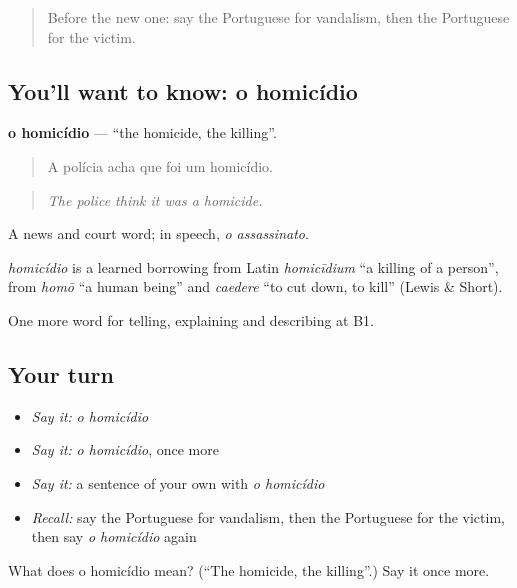 \label{lesson:PT-C286-homicidio}



\begin{quote}
Before the new one: say the Portuguese for vandalism, then the Portuguese for the victim.
\end{quote}

\subsection*{You'll want to know: o homicídio}
\textbf{o homicídio} — \textquotedblleft{}the homicide, the killing\textquotedblright{}.

\begin{quote}
A polícia acha que foi um homicídio.
\end{quote}

\begin{quote}
\emph{The police think it was a homicide.}
\end{quote}

A news and court word; in speech, \emph{o assassinato}.

\begin{cousinweb}
\emph{homicídio} is a learned borrowing from Latin \emph{homicīdium} \textquotedblleft{}a killing of a person\textquotedblright{}, from \emph{homō} \textquotedblleft{}a human being\textquotedblright{} and \emph{caedere} \textquotedblleft{}to cut down, to kill\textquotedblright{} (Lewis \& Short).
\end{cousinweb}

\begin{grammarlens}[title={What you've built}]
One more word for telling, explaining and describing at B1.
\end{grammarlens}

\subsection*{Your turn}
\begin{itemize}
\raggedright
  \item \emph{Say it:} \emph{o homicídio}
  \item \emph{Say it:} \emph{o homicídio}, once more
  \item \emph{Say it:} a sentence of your own with \emph{o homicídio}
  \item \emph{Recall:} say the Portuguese for vandalism, then the Portuguese for the victim, then say \emph{o homicídio} again
\end{itemize}

\begin{tcolorbox}[breakable,colback=teal!4,colframe=teal!35!black,title={Before you move on}]
What does o homicídio mean? (\textquotedblleft{}The homicide, the killing\textquotedblright{}.) Say it once more.
\end{tcolorbox}
